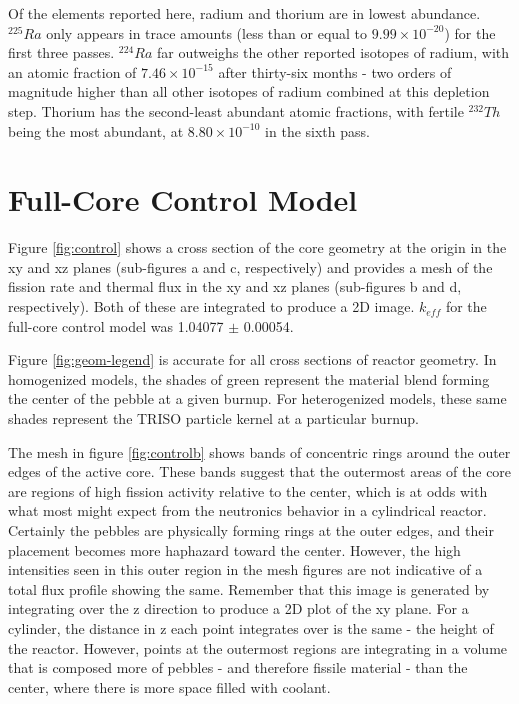 Of the elements reported here, radium and thorium are in lowest abundance.  $^{225}Ra$ only appears in trace amounts (less than or equal to $9.99\times10^{-20}$) for the first three passes.  $^{224}Ra$ far outweighs the other reported isotopes of radium, with an atomic fraction of $7.46\times10^{-15}$ after thirty-six months - two orders of magnitude higher than all other isotopes of radium combined at this depletion step.  Thorium has the second-least abundant atomic fractions, with fertile $^{232}Th$ being the most abundant, at $8.80\times10^{-10}$ in the sixth pass.

\section{Full-Core Control Model}

Figure \ref{fig:control} shows a cross section of the core geometry at the origin in the xy and xz planes (sub-figures a and c, respectively) and provides a mesh of the fission rate and thermal flux in the xy and xz planes (sub-figures b and d, respectively).  Both of these are integrated to produce a 2D image.  $k_{eff}$ for the full-core control model was 1.04077 $\pm$ 0.00054.


Figure \ref{fig:geom-legend} is accurate for all cross sections of reactor geometry.  In homogenized models, the shades of green represent the material blend forming the center of the pebble at a given burnup.  For heterogenized models, these same shades represent the TRISO particle kernel at a particular burnup.




The mesh in figure \ref{fig:controlb} shows bands of concentric rings around the outer edges of the active core.  These bands suggest that the outermost areas of the core are regions of high fission activity relative to the center, which is at odds with what most might expect from the neutronics behavior in a cylindrical reactor.  Certainly the pebbles are physically forming rings at the outer edges, and their placement becomes more haphazard toward the center.  However, the high intensities seen in this outer region in the mesh figures are not indicative of a total flux profile showing the same.  Remember that this image is generated by integrating over the z direction to produce a 2D plot of the xy plane.  For a cylinder, the distance in z each point integrates over is the same - the height of the reactor.  However, points at the outermost regions are integrating in a volume that is composed more of pebbles - and therefore fissile material - than the center, where there is more space filled with coolant.

